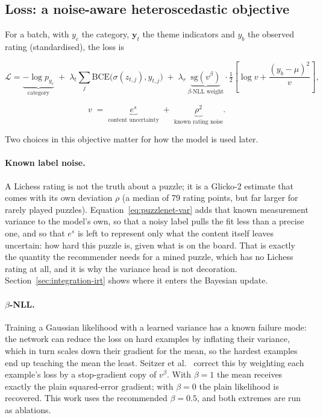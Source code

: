 \subsection{Loss: a noise-aware heteroscedastic objective}

For a batch, with $y_c$ the category, $\mathbf{y}_t$ the theme indicators and $y_b$ the observed
rating (standardised), the loss is

\begin{equation}\label{eq:puzzlenet-loss}
  \mathcal{L} = \underbrace{-\log p_{y_c}}_{\text{category}}
  \;+\; \lambda_t \sum_{j} \mathrm{BCE}\bigl(\sigma(z_{t,j}), y_{t,j}\bigr)
  \;+\; \lambda_r \, \underbrace{\mathrm{sg}\!\left(v^{\beta}\right)}_{\text{$\beta$-NLL weight}}
  \cdot \tfrac{1}{2}\left[\log v + \frac{(y_b - \mu)^2}{v}\right],
\end{equation}

\begin{equation}\label{eq:puzzlenet-var}
  v \;=\; \underbrace{e^{s}}_{\text{content uncertainty}} \;+\; \underbrace{\rho^2}_{\text{known rating noise}} .
\end{equation}

\noindent Two choices in this objective matter for how the model is used later.

\paragraph{Known label noise.} A Lichess rating is not the truth about a puzzle; it is a Glicko-2
estimate that comes with its own deviation $\rho$ (a median of 79 rating points, but far larger for
rarely played puzzles). Equation~\eqref{eq:puzzlenet-var} adds that known measurement variance to the
model's own, so that a noisy label pulls the fit less than a precise one, and so that $e^{s}$ is left
to represent only what the content itself leaves uncertain: how hard this puzzle is, given what is on
the board. That is exactly the quantity the recommender needs for a mined puzzle, which has no
Lichess rating at all, and it is why the variance head is not decoration. Section~\ref{sec:integration-irt}
shows where it enters the Bayesian update.

\paragraph{$\beta$-NLL.} Training a Gaussian likelihood with a learned variance has a known failure
mode: the network can reduce the loss on hard examples by inflating their variance, which in turn
scales down their gradient for the mean, so the hardest examples end up teaching the mean the least.
Seitzer et al.~\cite{seitzer2022pitfalls} correct this by weighting each example's loss by a
stop-gradient copy of $v^\beta$. With $\beta = 1$ the mean receives exactly the plain squared-error
gradient; with $\beta = 0$ the plain likelihood is recovered. This work uses the recommended
$\beta = 0.5$, and both extremes are run as ablations.

